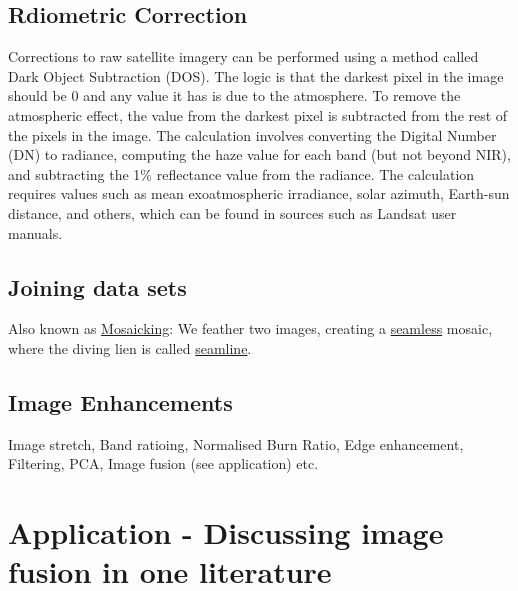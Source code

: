 \documentclass[
  letterpaper,
  DIV=11,
  numbers=noendperiod]{scrreprt}
\begin{document}
\hypertarget{rdiometric-correction}{%
\subsection{Rdiometric Correction}\label{rdiometric-correction}}

Corrections to raw satellite imagery can be performed using a method
called Dark Object Subtraction (DOS). The logic is that the darkest
pixel in the image should be 0 and any value it has is due to the
atmosphere. To remove the atmospheric effect, the value from the darkest
pixel is subtracted from the rest of the pixels in the image. The
calculation involves converting the Digital Number (DN) to radiance,
computing the haze value for each band (but not beyond NIR), and
subtracting the 1\% reflectance value from the radiance. The calculation
requires values such as mean exoatmospheric irradiance, solar azimuth,
Earth-sun distance, and others, which can be found in sources such as
Landsat user manuals.

\hypertarget{joining-data-sets}{%
\subsection{Joining data sets}\label{joining-data-sets}}

Also known as \uline{Mosaicking}: We feather two images, creating a
\uline{seamless} mosaic, where the diving lien is called
\uline{seamline}.

\hypertarget{image-enhancements}{%
\subsection{Image Enhancements}\label{image-enhancements}}

Image stretch, Band ratioing, Normalised Burn Ratio, Edge enhancement,
Filtering, PCA, Image fusion (see application) etc.

\hypertarget{application---discussing-image-fusion-in-one-literature}{%
\section{Application - Discussing image fusion in one
literature}\label{application---discussing-image-fusion-in-one-literature}}
\end{document}
